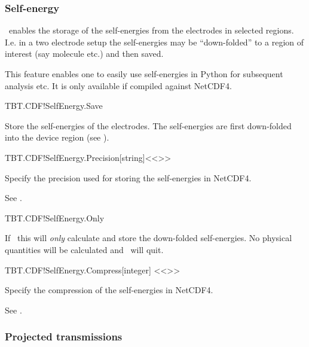\subsubsection{Self-energy}
\label{sec:self-energy}

\tbtrans\ enables the storage of the self-energies from the electrodes
in selected regions. I.e. in a two electrode setup the self-energies
may be ``down-folded'' to a region of interest (say molecule etc.) and
then saved.

This feature enables one to easily use self-energies in Python for
subsequent analysis etc. It is only available if compiled against
NetCDF4. 

\begin{fdflogicalF}{TBT.CDF!SelfEnergy.Save}

  Store the self-energies of the electrodes. The self-energies are
  first down-folded into the device region (see
  ).

\end{fdflogicalF}

\begin{fdfentry}{TBT.CDF!SelfEnergy.Precision}[string]<{<>}>

  Specify the precision used for storing the self-energies in NetCDF4.

  See .

\end{fdfentry}

\begin{fdflogicalF}{TBT.CDF!SelfEnergy.Only}
  
  If \fdftrue\ this will \emph{only} calculate and store the
  down-folded self-energies. No physical quantities will be calculated
  and \tbtrans\ will quit. 
  
\end{fdflogicalF}

\begin{fdfentry}{TBT.CDF!SelfEnergy.Compress}[integer]%
  <{<>}>
  
  Specify the compression of the self-energies in NetCDF4.
  
  See .
  
\end{fdfentry}


\subsubsection{Projected transmissions}

